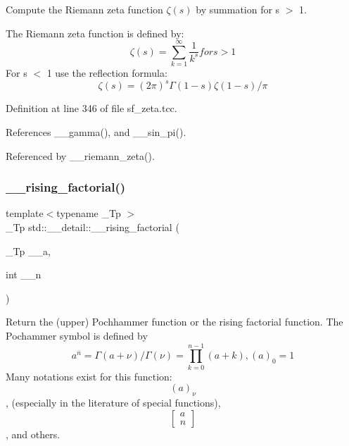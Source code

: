 Compute the Riemann zeta function $ \zeta(s) $ by summation for s $>$ 1. 

The Riemann zeta function is defined by\+: \[ \zeta(s) = \sum_{k=1}^{\infty} \frac{1}{k^{s}} for s > 1 \] For s $<$ 1 use the reflection formula\+: \[ \zeta(s) = (2\pi)^s \Gamma(1-s) \zeta(1-s) / \pi \] 

Definition at line 346 of file sf\+\_\+zeta.\+tcc.



References \+\_\+\+\_\+gamma(), and \+\_\+\+\_\+sin\+\_\+pi().



Referenced by \+\_\+\+\_\+riemann\+\_\+zeta().

\mbox{\label{namespacestd_1_1____detail_a5a4c41ee568639f8de4508051da9954a}} 
\subsubsection{\texorpdfstring{\+\_\+\+\_\+rising\+\_\+factorial()}{\_\_rising\_factorial()}\hspace{0.1cm}{\footnotesize\ttfamily [1/2]}}
{\footnotesize\ttfamily template$<$typename \+\_\+\+Tp $>$ \\
\+\_\+\+Tp std\+::\+\_\+\+\_\+detail\+::\+\_\+\+\_\+rising\+\_\+factorial (\begin{DoxyParamCaption}\item[{\+\_\+\+Tp}]{\+\_\+\+\_\+a,  }\item[{int}]{\+\_\+\+\_\+n }\end{DoxyParamCaption})}



Return the (upper) Pochhammer function or the rising factorial function. The Pochammer symbol is defined by \[ a^{\overline{n}} = \Gamma(a + \nu) / \Gamma(\nu) = \prod_{k=0}^{n-1} (a + k), (a)_0 = 1 \] Many notations exist for this function\+: \[ (a)_\nu \], (especially in the literature of special functions), \[ \left[ \begin{array}{c} a \\ n \end{array} \right] \], and others. 



